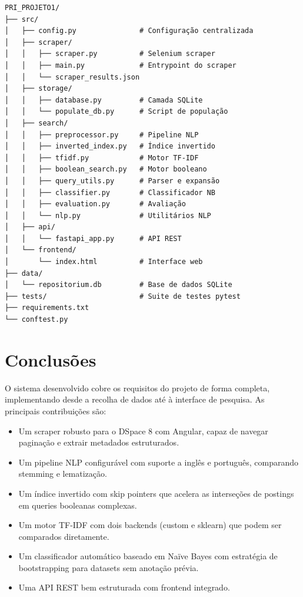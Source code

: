 \documentclass[12pt,a4paper]{article}
\begin{document}
\begin{verbatim}
PRI_PROJETO1/
├── src/
│   ├── config.py               # Configuração centralizada
│   ├── scraper/
│   │   ├── scraper.py          # Selenium scraper
│   │   ├── main.py             # Entrypoint do scraper
│   │   └── scraper_results.json
│   ├── storage/
│   │   ├── database.py         # Camada SQLite
│   │   └── populate_db.py      # Script de população
│   ├── search/
│   │   ├── preprocessor.py     # Pipeline NLP
│   │   ├── inverted_index.py   # Índice invertido
│   │   ├── tfidf.py            # Motor TF-IDF
│   │   ├── boolean_search.py   # Motor booleano
│   │   ├── query_utils.py      # Parser e expansão
│   │   ├── classifier.py       # Classificador NB
│   │   ├── evaluation.py       # Avaliação
│   │   └── nlp.py              # Utilitários NLP
│   ├── api/
│   │   └── fastapi_app.py      # API REST
│   └── frontend/
│       └── index.html          # Interface web
├── data/
│   └── repositorium.db         # Base de dados SQLite
├── tests/                      # Suite de testes pytest
├── requirements.txt
└── conftest.py
\end{verbatim}

\section{Conclusões}

O sistema desenvolvido cobre os requisitos do projeto de forma completa, implementando desde a recolha de dados até à interface de pesquisa. As principais contribuições são:

\begin{itemize}
    \item Um scraper robusto para o DSpace 8 com Angular, capaz de navegar paginação e extrair metadados estruturados.
    \item Um pipeline NLP configurável com suporte a inglês e português, comparando stemming e lematização.
    \item Um índice invertido com skip pointers que acelera as interseções de postings em queries booleanas complexas.
    \item Um motor TF-IDF com dois backends (custom e sklearn) que podem ser comparados diretamente.
    \item Um classificador automático baseado em Naïve Bayes com estratégia de bootstrapping para datasets sem anotação prévia.
    \item Uma API REST bem estruturada com frontend integrado.
\end{itemize}
\end{document}
